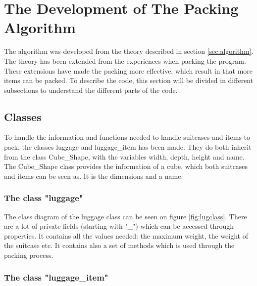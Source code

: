 \section{The Development of The Packing Algorithm}
\label{sec:devalgorithm}
The algorithm was developed from the theory described in section \ref{sec:algorithm}. The theory has been extended from the experiences when packing the program. These extensions have made the packing more effective, which result in that more items can be packed. To describe the code, this section will be divided in different subsections to understand the different parts of the code.
\subsection{Classes}
To handle the information and functions needed to handle suitcases and items to pack, the classes luggage and luggage\_item has been made. They do both inherit from the class Cube\_Shape, with the variables width, depth, height and name. The Cube\_Shape class provides the information of a cube, which both suitcases and items can be seen as. It is the dimensions and a name. 
\subsubsection{The class "luggage"}
The class diagram of the luggage class can be seen on figure \ref{fig:lugclass}. There are a lot of private fields (starting with "\_") which can be accessed through properties. It contains all the values needed: the maximum weight, the weight of the suitcase etc. It contains also a set of methods which is used through the packing process.



\subsubsection{The class "luggage_item"}